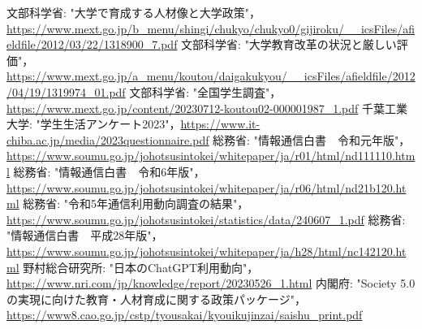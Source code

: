 \documentclass[12pt,a4j,titlepage]{ltjsarticle}
\begin{document}
\begin{thebibliography}{99}
文部科学省: "大学で育成する人材像と大学政策"，\url{https://www.mext.go.jp/b_menu/shingi/chukyo/chukyo0/gijiroku/__icsFiles/afieldfile/2012/03/22/1318900_7.pdf}
文部科学省: "大学教育改革の状況と厳しい評価"，\url{https://www.mext.go.jp/a_menu/koutou/daigakukyou/__icsFiles/afieldfile/2012/04/19/1319974_01.pdf}
文部科学省: "全国学生調査"，\url{https://www.mext.go.jp/content/20230712-koutou02-000001987_1.pdf}
千葉工業大学: "学生生活アンケート2023"，\url{https://www.it-chiba.ac.jp/media/2023questionnaire.pdf}
総務省: "情報通信白書　令和元年版"，\url{https://www.soumu.go.jp/johotsusintokei/whitepaper/ja/r01/html/nd111110.html}
総務省: "情報通信白書　令和6年版"，\url{https://www.soumu.go.jp/johotsusintokei/whitepaper/ja/r06/html/nd21b120.html}
総務省: "令和5年通信利用動向調査の結果"，\url{https://www.soumu.go.jp/johotsusintokei/statistics/data/240607_1.pdf}
総務省: "情報通信白書　平成28年版"，\url{https://www.soumu.go.jp/johotsusintokei/whitepaper/ja/h28/html/nc142120.html}
野村総合研究所: "日本のChatGPT利用動向"，\url{https://www.nri.com/jp/knowledge/report/20230526_1.html}
内閣府: "Society 5.0の実現に向けた教育・人材育成に関する政策パッケージ"，\url{https://www8.cao.go.jp/cstp/tyousakai/kyouikujinzai/saishu_print.pdf}
\end{thebibliography}
\end{document}
